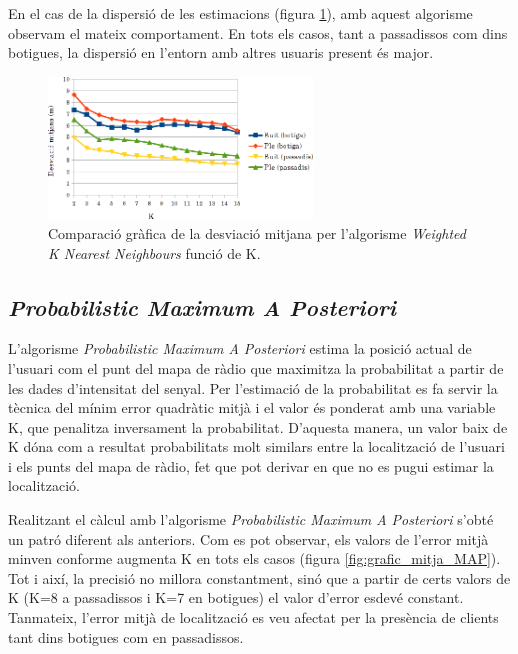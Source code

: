 En el cas de la dispersió de les estimacions (figura \ref{fig:grafic_desviacio_WKNN}), amb aquest algorisme observam el mateix comportament. En tots els casos, tant a passadissos com dins botigues, la dispersió en l'entorn amb altres usuaris present és major. 

\begin{figure}[ht]
\begin{center}
\includegraphics[width=7cm]{imatges/wknn_desviacio.png}
\caption{Comparació gràfica de la desviació mitjana per l'algorisme \textit{Weighted K Nearest Neighbours} funció de K.}
\label{fig:grafic_desviacio_WKNN}
\end{center}
\end{figure}

\subsection{\textit{Probabilistic Maximum A Posteriori}}

L'algorisme \textit{Probabilistic Maximum A Posteriori} estima la posició actual de l'usuari com el punt del mapa de ràdio que maximitza la probabilitat a partir de les dades d'intensitat del senyal. Per l'estimació de la probabilitat es fa servir la tècnica del mínim error quadràtic mitjà i el valor és ponderat amb una variable K, que penalitza inversament la probabilitat. D'aquesta manera, un valor baix de K dóna com a resultat probabilitats molt similars entre la localització de l'usuari i els punts del mapa de ràdio, fet que pot derivar en que no es pugui estimar la localització.

Realitzant el càlcul amb l'algorisme \textit{Probabilistic Maximum A Posteriori} s'obté un patró diferent als anteriors. Com es pot observar, els valors de l'error mitjà minven conforme augmenta K en tots els casos (figura \ref{fig:grafic_mitja_MAP}). Tot i així, la precisió no millora constantment, sinó que a partir de certs valors de K (K=8 a passadissos i K=7 en botigues) el valor d'error esdevé constant. Tanmateix, l'error mitjà de localització es veu afectat per la presència de clients tant dins botigues com en passadissos.

